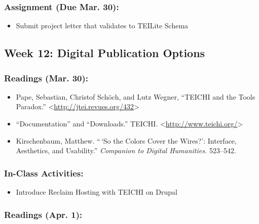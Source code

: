\documentclass[]{article}
\begin{document}
\subsubsection{Assignment (Due Mar. 30):}\label{assignment-due-mar.-30}

\begin{itemize}
\itemsep1pt\parskip0pt
\item
  Submit project letter that validates to TEILite Schema
\end{itemize}

\subsection{Week 12: Digital Publication
Options}\label{week-12-digital-publication-options}

\subsubsection{Readings (Mar. 30):}\label{readings-mar.-30}

\begin{itemize}
\itemsep1pt\parskip0pt
\item
  Pape, Sebastian, Christof Schöch, and Lutz Wegner, ``TEICHI and the
  Tools Paradox.''
  \textless{}\url{http://jtei.revues.org/432}\textgreater{}
\item
  ``Documentation'' and ``Downloads.'' TEICHI.
  \textless{}\url{http://www.teichi.org/}\textgreater{}
\item
  Kirschenbaum, Matthew. ``\,`So the Colors Cover the Wires?':
  Interface, Aesthetics, and Usability.'' \emph{Companion to Digital
  Humanities.} 523--542.
\end{itemize}

\subsubsection{In-Class Activities:}\label{in-class-activities-2}

\begin{itemize}
\itemsep1pt\parskip0pt
\item
  Introduce Reclaim Hosting with TEICHI on Drupal
\end{itemize}

\subsubsection{Readings (Apr. 1):}\label{readings-apr.-1}
\end{document}
